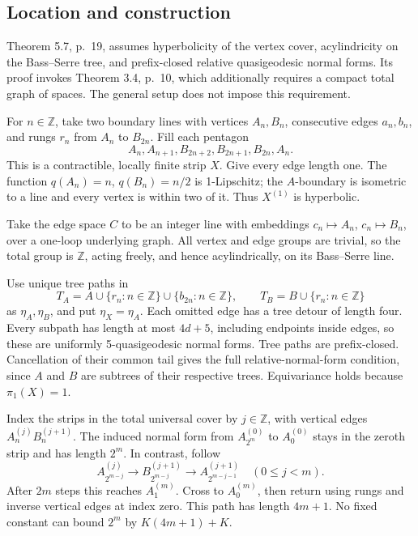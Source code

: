 \documentclass[10pt]{article}
\begin{document}
\subsection*{Location and construction}
Theorem 5.7, p. 19, assumes hyperbolicity of the vertex cover, acylindricity on the Bass–Serre tree, and prefix-closed relative quasigeodesic normal forms. Its proof invokes Theorem 3.4, p. 10, which additionally requires a compact total graph of spaces. The general setup does not impose this requirement.\par
For \(n\in\mathbb Z\), take two boundary lines with vertices \(A_n,B_n\), consecutive edges \(a_n,b_n\), and rungs \(r_n\) from \(A_n\) to \(B_{2n}\). Fill each pentagon \[A_n,A_{n+1},B_{2n+2},B_{2n+1},B_{2n},A_n.\] This is a contractible, locally finite strip \(X\). Give every edge length one. The function \(q(A_n)=n\), \(q(B_n)=n/2\) is 1-Lipschitz; the \(A\)-boundary is isometric to a line and every vertex is within two of it. Thus \(X^{(1)}\) is hyperbolic.\par
Take the edge space \(C\) to be an integer line with embeddings \(c_n\mapsto A_n\), \(c_n\mapsto B_n\), over a one-loop underlying graph. All vertex and edge groups are trivial, so the total group is \(\mathbb Z\), acting freely, and hence acylindrically, on its Bass–Serre line.\par
Use unique tree paths in \[T_A=A\cup\{r_n:n\in\mathbb Z\}\cup\{b_{2n}:n\in\mathbb Z\},
 \qquad T_B=B\cup\{r_n:n\in\mathbb Z\}\] as \(\eta_A,\eta_B\), and put \(\eta_X=\eta_A\). Each omitted edge has a tree detour of length four. Every subpath has length at most \(4d+5\), including endpoints inside edges, so these are uniformly 5-quasigeodesic normal forms. Tree paths are prefix-closed. Cancellation of their common tail gives the full relative-normal-form condition, since \(A\) and \(B\) are subtrees of their respective trees. Equivariance holds because \(\pi_1(X)=1\).\par
Index the strips in the total universal cover by \(j\in\mathbb Z\), with vertical edges \(A_n^{(j)}B_n^{(j+1)}\). The induced normal form from \(A_{2^m}^{(0)}\) to \(A_0^{(0)}\) stays in the zeroth strip and has length \(2^m\). In contrast, follow \[A_{2^{m-j}}^{(j)}
 \longrightarrow B_{2^{m-j}}^{(j+1)}
 \longrightarrow A_{2^{m-j-1}}^{(j+1)}
 \quad (0\le j<m).\] After \(2m\) steps this reaches \(A_1^{(m)}\). Cross to \(A_0^{(m)}\), then return using rungs and inverse vertical edges at index zero. This path has length \(4m+1\). No fixed constant can bound \(2^m\) by \(K(4m+1)+K\).\par
\end{document}
